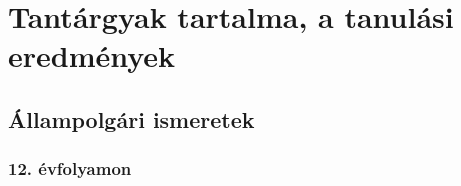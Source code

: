 \hypertarget{tantargyak-tartalma-a-tanulasi-eredmenyek}{%
\section{Tantárgyak tartalma, a tanulási
eredmények}\label{tantargyak-tartalma-a-tanulasi-eredmenyek}}

\hypertarget{allampolgari-ismeretek}{%
\subsection{Állampolgári ismeretek}\label{allampolgari-ismeretek}}

\hypertarget{evfolyamon}{%
\subsubsection{12. évfolyamon}\label{evfolyamon}}

